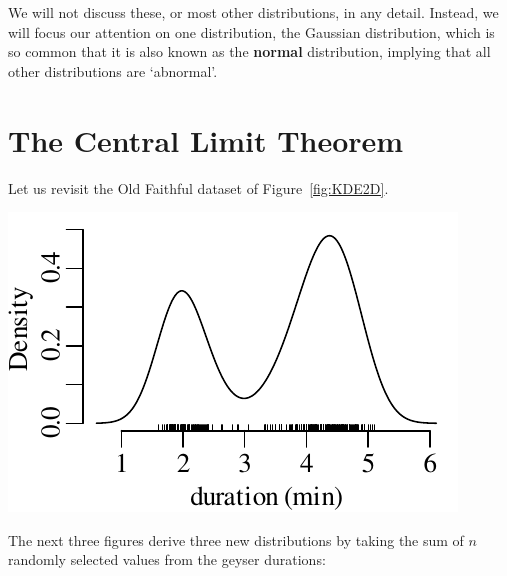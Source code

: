 We will not discuss these, or most other distributions, in any detail.
Instead, we will focus our attention on one distribution, the Gaussian
distribution, which is so common that it is also known as the
\textbf{normal} distribution, implying that all other distributions
are `abnormal'.

\section{The Central Limit Theorem}
\label{sec:CLT}

Let us revisit the Old Faithful dataset of Figure~\ref{fig:KDE2D}.
  
\noindent\begin{minipage}[t][][b]{.35\textwidth}
  \includegraphics[width=\textwidth]{../figures/CLTfaithful1.pdf}\\
\end{minipage}
\begin{minipage}[t][][t]{.65\textwidth}
  \label{fig:CLTfaithful1}
\end{minipage}

The next three figures derive three new distributions by taking the
sum of $n$ randomly selected values from the geyser durations:


